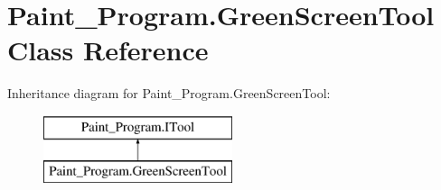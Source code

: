 \hypertarget{class_paint___program_1_1_green_screen_tool}{}\section{Paint\+\_\+\+Program.\+Green\+Screen\+Tool Class Reference}
\label{class_paint___program_1_1_green_screen_tool}
Inheritance diagram for Paint\+\_\+\+Program.\+Green\+Screen\+Tool\+:\begin{figure}[H]
\begin{center}
\leavevmode
\includegraphics[height=2.000000cm]{class_paint___program_1_1_green_screen_tool}
\end{center}
\end{figure}
